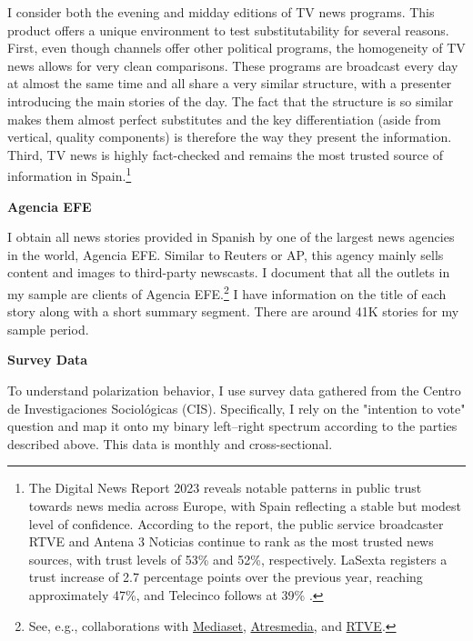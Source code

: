 \documentclass[12pt]{article}
\begin{document}
	I consider both the evening and midday editions of TV news programs. This product offers a unique environment to test substitutability for several reasons. First, even though channels offer other political programs, the homogeneity of TV news allows for very clean comparisons. These programs are broadcast every day at almost the same time and all share a very similar structure, with a presenter introducing the main stories of the day. The fact that the structure is so similar makes them almost perfect substitutes and the key differentiation (aside from vertical, quality components) is therefore the way they present the information. Third, TV news is highly fact-checked and remains the most trusted source of information in Spain.\footnote{The Digital News Report 2023 reveals notable patterns in public trust towards news media across Europe, with Spain reflecting a stable but modest level of confidence. According to the report, the public service broadcaster RTVE and Antena 3 Noticias continue to rank as the most trusted news sources, with trust levels of 53\% and 52\%, respectively. LaSexta registers a trust increase of 2.7 percentage points over the previous year, reaching approximately 47\%, and Telecinco follows at 39\% \citep{reuters_dnr_2023}.}
	
	\textbf{Agencia EFE}
	
	I obtain all news stories provided in Spanish by one of the largest news agencies in the world, Agencia EFE. Similar to Reuters or AP, this agency mainly sells content and images to third-party newscasts. I document that all the outlets in my sample are clients of Agencia EFE.\footnote{See, e.g., collaborations with \href{https://www.telecinco.es/autores/agencia-efe/}{Mediaset}, \href{https://cadenaser.com/nacional/2024/09/22/el-teletexto-una-herramienta-olvidada-que-aun-perdura-en-nuestras-televisiones-cadena-ser/}{Atresmedia}, and \href{https://www.rtve.es/rtve/20130301/rtve-agencia-efe-firman-convenio-colaboracion/611440.shtml}{RTVE}.} I have information on the title of each story along with a short summary segment. There are around 41K stories for my sample period.
	
	\textbf{Survey Data}
	
	To understand polarization behavior, I use survey data gathered from the Centro de Investigaciones Sociológicas (CIS). Specifically, I rely on the "intention to vote" question and map it onto my binary left–right spectrum according to the parties described above. This data is monthly and cross-sectional.
	
\end{document}
